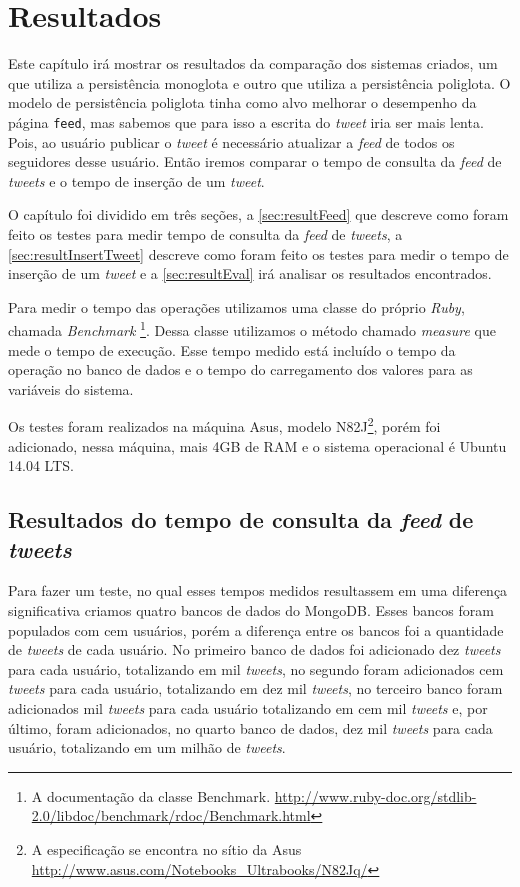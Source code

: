 \chapter{Resultados}
\label{chap:resultados}
Este capítulo irá mostrar os resultados da comparação dos sistemas criados, um que utiliza a persistência monoglota e outro que utiliza a persistência poliglota. O modelo de persistência poliglota tinha como alvo melhorar o desempenho da página \verb|feed|, mas sabemos que para isso a escrita do \textit{tweet} iria ser mais lenta. Pois, ao usuário publicar o \textit{tweet} é necessário atualizar a \textit{feed} de todos os seguidores desse usuário. Então iremos comparar o tempo de consulta da \textit{feed} de \textit{tweets} e o tempo de inserção de um \textit{tweet}. 

O capítulo foi dividido em três seções, a \autoref{sec:resultFeed} que descreve como foram feito os testes para medir tempo de consulta da \textit{feed} de \textit{tweets}, a \autoref{sec:resultInsertTweet} descreve como foram feito os testes para medir o tempo de inserção de um \textit{tweet} e a \autoref{sec:resultEval} irá analisar os resultados encontrados.

Para medir o tempo das operações utilizamos uma classe do próprio \textit{Ruby}, chamada \textit{Benchmark} \footnote{A documentação da classe Benchmark. \url{http://www.ruby-doc.org/stdlib-2.0/libdoc/benchmark/rdoc/Benchmark.html}}. Dessa classe utilizamos o método chamado \textit{measure} que mede o tempo de execução. Esse tempo medido está incluído o tempo da operação no banco de dados e o tempo do carregamento dos valores para as variáveis do sistema.

Os testes foram realizados na máquina Asus, modelo N82J\footnote{A especificação se encontra no sítio da Asus \url{http://www.asus.com/Notebooks_Ultrabooks/N82Jq/}}, porém foi adicionado, nessa máquina, mais 4GB de RAM e o sistema operacional é Ubuntu 14.04 LTS.


\section{Resultados do tempo de consulta da \textit{feed} de \textit{tweets}}
\label{sec:resultFeed}

Para fazer um teste, no qual esses tempos medidos resultassem em uma diferença significativa criamos quatro bancos de dados do MongoDB. Esses bancos foram populados com cem usuários, porém a diferença entre os bancos foi a quantidade de \textit{tweets} de cada usuário. No primeiro banco de dados foi adicionado dez \textit{tweets} para cada usuário, totalizando em mil \textit{tweets}, no segundo foram adicionados cem \textit{tweets} para cada usuário, totalizando em dez mil \textit{tweets}, no terceiro banco foram adicionados mil \textit{tweets} para cada usuário totalizando em cem mil \textit{tweets} e, por último, foram adicionados, no quarto banco de dados, dez mil \textit{tweets} para cada usuário, totalizando em um milhão de \textit{tweets}.

